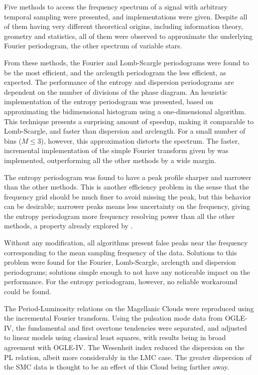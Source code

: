 

Five methods to access the frequency spectrum of a signal with arbitrary temporal sampling were presented, and implementations were given.
Despite all of them having very different theoretical origins, including information theory, geometry and statistics,
all of them were observed to approximate the underlying Fourier periodogram, the other spectrum of variable stars.

From these methods, the Fourier and Lomb-Scargle periodograms were found to be the most efficient, 
and the arclength periodogram the less efficient, as expected.
The performance of the entropy and dispersion periodograms are dependent on the number of divisions of the phase diagram.
An heuristic implementation of the entropy periodogram was presented, based on approximating the bidimensional histogram using a one-dimensional algorithm.
This technique presents a surprising amount of speedup, making it comparable to Lomb-Scargle, and faster than dispersion and arclength. 
For a small number of bins ($M\leq3$), however, this approximation distorts the spectrum.
The faster, incremental implementation of the simple Fourier transform given by \cite{Kurtz1985} was implemented, 
outperforming all the other methods by a wide margin.

The entropy periodogram was found to have a peak profile sharper and narrower than the other methods.
This is another efficiency problem in the sense that the frequency grid should be much finer to avoid missing the peak,
but this behavior can be desirable; narrower peaks means less uncertainty on the frequency, 
giving the entropy periodogram more frequency resolving power than all the other methods, a property already explored by \cite{Cincotta1999II}.

Without any modification, all algorithms present false peaks near the frequency corresponding to the mean sampling frequency of the data.
Solutions to this problem were found for the Fourier, Lomb-Scargle, arclength and dispersion periodograms; 
solutions simple enough to not have any noticeable impact on the performance.
For the entropy periodogram, however, no reliable workaround could be found.

The Period-Luminosity relations on the Magellanic Clouds were reproduced using the incremental Fourier transform.
Using the pulsation mode data from OGLE-IV, the fundamental and first overtone tendencies were separated, 
and adjusted to linear models using classical least squares, with results being in broad agreement with OGLE-IV.
The Wesenheit index reduced the dispersion on the PL relation, albeit more considerably in the LMC case.
The greater dispersion of the SMC data is thought to be an effect of this Cloud being farther away.

